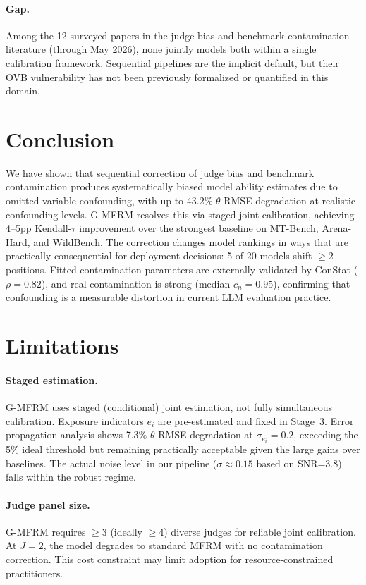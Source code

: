 \documentclass[11pt,twocolumn]{article}
\newcommand{\gmfrm}{\textsc{G-MFRM}}
\begin{document}
\paragraph{Gap.} Among the 12 surveyed papers in the judge bias and benchmark contamination literature (through May 2026), none jointly models both within a single calibration framework. Sequential pipelines are the implicit default, but their OVB vulnerability has not been previously formalized or quantified in this domain.

\section{Conclusion}

We have shown that sequential correction of judge bias and benchmark contamination produces systematically biased model ability estimates due to omitted variable confounding, with up to 43.2\% $\theta$-RMSE degradation at realistic confounding levels. \gmfrm{} resolves this via staged joint calibration, achieving 4--5pp Kendall-$\tau$ improvement over the strongest baseline on MT-Bench, Arena-Hard, and WildBench. The correction changes model rankings in ways that are practically consequential for deployment decisions: 5 of 20 models shift $\geq$2 positions. Fitted contamination parameters are externally validated by ConStat ($\rho=0.82$), and real contamination is strong (median $c_n=0.95$), confirming that confounding is a measurable distortion in current LLM evaluation practice.

\section*{Limitations}

\paragraph{Staged estimation.} \gmfrm{} uses staged (conditional) joint estimation, not fully simultaneous calibration. Exposure indicators $e_i$ are pre-estimated and fixed in Stage~3. Error propagation analysis shows 7.3\% $\theta$-RMSE degradation at $\sigma_{e_i}=0.2$, exceeding the 5\% ideal threshold but remaining practically acceptable given the large gains over baselines. The actual noise level in our pipeline ($\sigma \approx 0.15$ based on SNR=3.8) falls within the robust regime.

\paragraph{Judge panel size.} \gmfrm{} requires $\geq$3 (ideally $\geq$4) diverse judges for reliable joint calibration. At $J=2$, the model degrades to standard MFRM with no contamination correction. This cost constraint may limit adoption for resource-constrained practitioners.
\end{document}
